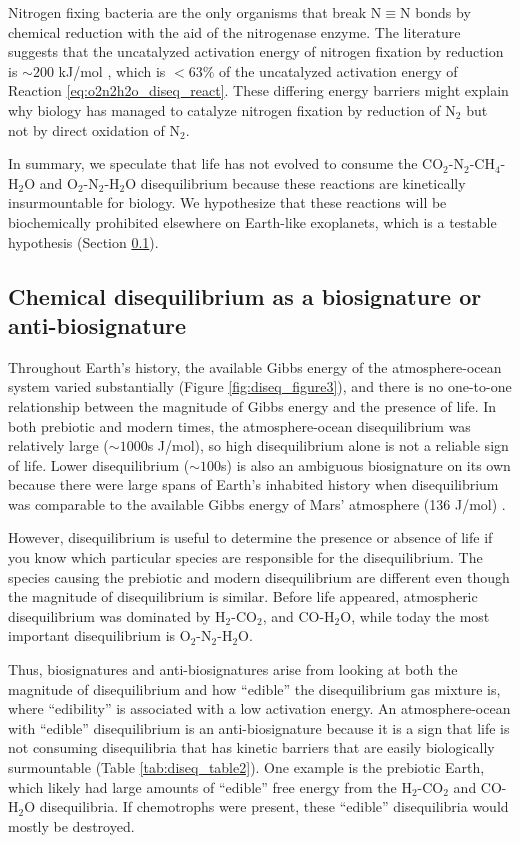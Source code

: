 Nitrogen fixing bacteria are the only organisms that break $\mathrm{N \equiv N}$ bonds by chemical reduction with the aid of the nitrogenase enzyme. The literature suggests that the uncatalyzed activation energy of nitrogen fixation by reduction is $\sim 200$ kJ/mol \citep{Hageman_1980}, which is $< 63\%$ of the uncatalyzed activation energy of Reaction \eqref{eq:o2n2h2o_diseq_react}. These differing energy barriers might explain why biology has managed to catalyze nitrogen fixation by reduction of N$_2$ but not by direct oxidation of N$_2$.

In summary, we speculate that life has not evolved to consume the CO$_2$-N$_2$-CH$_4$-H$_2$O and O$_2$-N$_2$-H$_2$O disequilibrium because these reactions are kinetically insurmountable for biology. We hypothesize that these reactions will be biochemically prohibited elsewhere on Earth-like exoplanets, which is a testable hypothesis 
(Section \ref{}).

\subsection{Chemical disequilibrium as a biosignature or anti-biosignature}

Throughout Earth's history, the available Gibbs energy of the atmosphere-ocean system varied substantially (Figure \ref{fig:diseq_figure3}), and there is no one-to-one relationship between the magnitude of Gibbs energy and the presence of life. In both prebiotic and modern times, the atmosphere-ocean disequilibrium was relatively large ($\sim 1000$s J/mol), so high disequilibrium alone is not a reliable sign of life. Lower disequilibrium ($\sim 100$s) is also an ambiguous biosignature on its own because there were large spans of Earth's inhabited history when disequilibrium was comparable to the available Gibbs energy of Mars' atmosphere (136 J/mol) \citep{KrissansenTotton_2016}.

However, disequilibrium is useful to determine the presence or absence of life if you know which particular species are responsible for the disequilibrium. The species causing the prebiotic and modern disequilibrium are different even though the magnitude of disequilibrium is similar. Before life appeared, atmospheric disequilibrium was dominated by H$_2$-CO$_2$, and CO-H$_2$O, while today the most important disequilibrium is O$_2$-N$_2$-H$_2$O. 

Thus, biosignatures and anti-biosignatures arise from looking at both the magnitude of disequilibrium and how ``edible'' the disequilibrium gas mixture is, where ``edibility'' is associated with a low activation energy. An atmosphere-ocean with ``edible'' disequilibrium is an anti-biosignature because it is a sign that life is not consuming disequilibria that has kinetic barriers that are easily biologically surmountable (Table \ref{tab:diseq_table2}). One example is the prebiotic Earth, which likely had large amounts of ``edible'' free energy from the H$_2$-CO$_2$ and CO-H$_2$O disequilibria. If chemotrophs were present, these ``edible'' disequilibria would mostly be destroyed.

